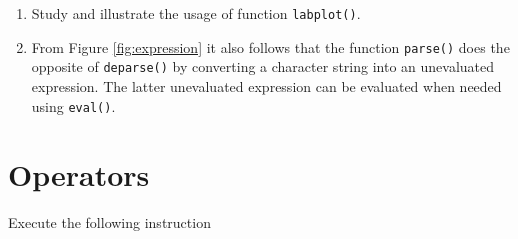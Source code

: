 \documentclass[
]{book}
\newenvironment{Shaded}{\begin{snugshade}}{\end{snugshade}}
\newcommand{\CommentTok}[1]{\textcolor[rgb]{0.56,0.35,0.01}{\textit{#1}}}
\newcommand{\DecValTok}[1]{\textcolor[rgb]{0.00,0.00,0.81}{#1}}
\newcommand{\FunctionTok}[1]{\textcolor[rgb]{0.13,0.29,0.53}{\textbf{#1}}}
\newcommand{\NormalTok}[1]{#1}
\newcommand{\SpecialCharTok}[1]{\textcolor[rgb]{0.81,0.36,0.00}{\textbf{#1}}}
\newcommand{\StringTok}[1]{\textcolor[rgb]{0.31,0.60,0.02}{#1}}
\begin{document}
\begin{enumerate}
\def\labelenumi{(\alph{enumi})}
\item
  Study and illustrate the usage of function \texttt{labplot()}.
\item
  From Figure \ref{fig:expression} it also follows that the function \texttt{parse()} does the opposite of \texttt{deparse()} by converting a character string into an unevaluated expression. The latter unevaluated expression can be evaluated when needed using \texttt{eval()}.
\end{enumerate}

\section{Operators}\label{operators-1}

Execute the following instruction

\begin{Shaded}
\end{Shaded}
\end{document}
